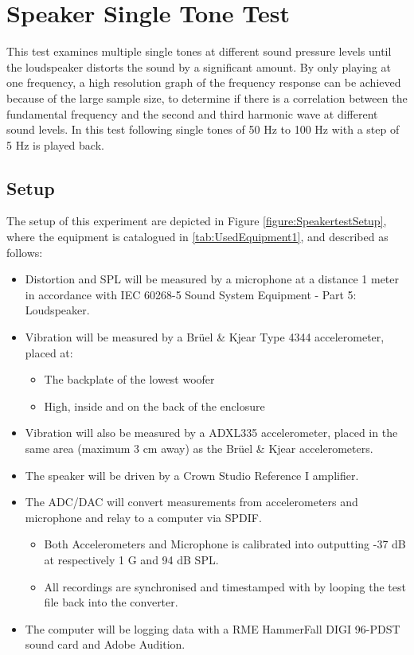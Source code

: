 \chapter{Speaker Single Tone Test} \label{app:journal_speaker_test2}

This test examines multiple single tones at different sound pressure levels until the loudspeaker distorts the sound by a significant amount. By only playing at one frequency, a high resolution graph of the frequency response can be achieved because of the large sample size, to determine if there is a correlation between the fundamental frequency and the second and third harmonic wave at different sound levels. In this test following single tones of 50 Hz to 100 Hz with a step of 5 Hz is played back.


\section{Setup}

The setup of this experiment are depicted in Figure \ref{figure:SpeakertestSetup}, where the equipment is catalogued in \autoref{tab:UsedEquipment1}, and described as follows:

\begin{itemize}
\item Distortion and \gls{SPL} will be measured by a microphone at a distance 1 meter in accordance with IEC 60268-5 Sound System Equipment - Part 5: Loudspeaker.
\item Vibration will be measured by a Brüel \& Kjear Type 4344 accelerometer, placed at:
\begin{itemize}
\item The backplate of the lowest woofer
\item High, inside and on the back of the enclosure 
\end{itemize}
\item Vibration will also be measured by a ADXL335 accelerometer, placed in the same area (maximum 3 cm away) as the Brüel \& Kjear accelerometers. 
\item The speaker will be driven by a Crown Studio Reference I amplifier.
\item The ADC/DAC will convert measurements from accelerometers and microphone and relay to a computer via SPDIF.
\begin{itemize}
\item Both Accelerometers and Microphone is calibrated into outputting -37 dB at respectively 1 G and 94 dB \gls{SPL}.
\item All recordings are synchronised and timestamped with by looping the test file back into the converter.
\end{itemize}
\item The computer will be logging data with a RME HammerFall DIGI 96-PDST sound card and Adobe Audition.
\end{itemize}

